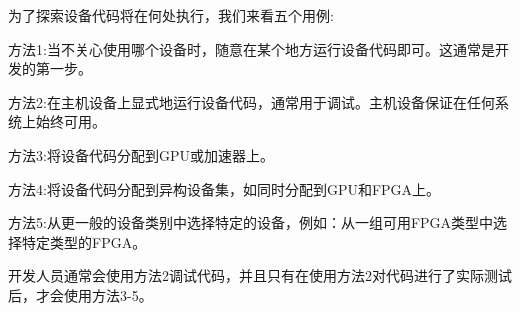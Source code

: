 为了探索设备代码将在何处执行，我们来看五个用例:\par

方法1:当不关心使用哪个设备时，随意在某个地方运行设备代码即可。这通常是开发的第一步。\par

方法2:在主机设备上显式地运行设备代码，通常用于调试。主机设备保证在任何系统上始终可用。\par

方法3:将设备代码分配到GPU或加速器上。\par

方法4:将设备代码分配到异构设备集，如同时分配到GPU和FPGA上。\par

方法5:从更一般的设备类别中选择特定的设备，例如：从一组可用FPGA类型中选择特定类型的FPGA。\par

\begin{tcolorbox}[colback=red!5!white,colframe=red!75!black]
开发人员通常会使用方法2调试代码，并且只有在使用方法2对代码进行了实际测试后，才会使用方法3-5。
\end{tcolorbox}












